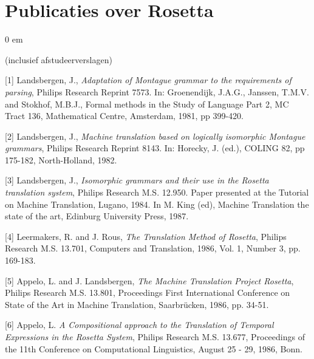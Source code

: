 
\setlength{\parindent}{0in}
\setlength{\textheight}{52pc}
\setlength{\textwidth}{40pc}
\setlength{\topmargin}{1pc}
\setlength{\oddsidemargin}{.5pc}
\setlength{\evensidemargin}{.5pc}
\renewcommand{\baselinestretch}{1.5}






\section*{Publicaties over Rosetta}
\setlength{\parindent} {0 em}

\bigskip

(inclusief afstudeerverslagen)\\

\bigskip

[1] Landsbergen, J., {\em Adaptation of Montague grammar to the requirements
        of parsing}, Philips Research Reprint 7573. In: Groenendijk, J.A.G., 
        Janssen, T.M.V. and Stokhof, M.B.J., {\sf Formal methods in the Study of 
        Language Part 2}, MC Tract 136, Mathematical Centre, Amsterdam, 1981, 
        pp 399-420.
\bigskip

[2] Landsbergen, J., {\em Machine translation based on logically isomorphic
        Montague grammars}, Philips Research Reprint 8143. In: Horecky, J. 
        (ed.), {\sf COLING 82}, pp 175-182, North-Holland, 1982.
\bigskip

[3] Landsbergen, J., {\em Isomorphic grammars and their use in the Rosetta
translation system}, Philips Research M.S. 12.950.
Paper presented at the Tutorial on Machine Translation,
Lugano, 1984. 
In M. King (ed), {\sf Machine Translation the state of the
art}, Edinburg University Press, 1987.
\bigskip

[4] Leermakers, R. and J. Rous, {\em The Translation Method of Rosetta},
Philips Research M.S. 13.701,
{\sf Computers and Translation}, 1986, Vol. 1, Number 3, pp. 169-183.

\bigskip


[5] Appelo, L. and J. Landsbergen, {\em The Machine Translation Project
Rosetta}, Philips Research M.S. 13.801,
{\sf Proceedings First International Conference on State of the Art in 
Machine Translation}, Saarbr\"{u}cken, 1986, pp. 34-51.

\bigskip

[6] Appelo, L. {\em A Compositional approach to the Translation of Temporal
        Expressions in the Rosetta System}, Philips Research M.S. 13.677,
        {\sf Proceedings of the 11th Conference on Computational Linguistics},
        August 25 - 29, 1986, Bonn.

